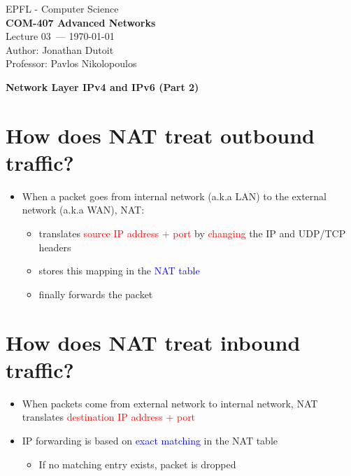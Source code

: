 \documentclass[11pt]{article}
\newcommand{\coursename}{COM-407 Advanced Networks}
\newcommand{\lecturenum}{03}
\newcommand{\lecturedate}{\today}
\newcommand{\professor}{Pavlos Nikolopoulos}
\begin{document}
\begin{center}
  {\large EPFL - Computer Science} \\[0.5em]
  {\Large \textbf{\coursename}} \\[0.5em]
  {\large Lecture \lecturenum\ --- \lecturedate} \\[0.5em]
  {\large Author: Jonathan Dutoit} \\[0.5em]
  {\large Professor: \professor} \\[0.5em]
\end{center}

\vspace{2cm}

\begin{center}
  {\LARGE \textbf{Network Layer IPv4 and IPv6 (Part 2)}}
\end{center}

\vspace{1cm}

\section*{How does NAT treat outbound traffic?}

\begin{itemize}
	\item When a packet goes from internal network (a.k.a LAN) to the external network (a.k.a WAN), NAT:
	\begin{itemize}
		\item translates \textcolor{red}{source IP address + port} by \textcolor{red}{changing} the IP and UDP/TCP headers
		\item stores this mapping in the \textcolor{blue}{NAT table}
		\item finally forwards the packet
	\end{itemize}
\end{itemize}

\section*{How does NAT treat inbound traffic?}

\begin{itemize}
	\item When packets come from external network to internal network, NAT translates \textcolor{red}{destination IP address + port}
	\item IP forwarding is based on \textcolor{blue}{exact matching} in the NAT table
		\begin{itemize}
			\item If no matching entry exists, packet is dropped
		\end{itemize}
\end{itemize}
\end{document}
